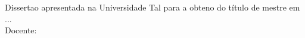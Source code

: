 \begin{titlepage}
  \begin{center}
    \Large{\AUTOR}\\[10cm]
    \Large{\textbf{\TITULO}}\\[2cm]
    \hspace{.45\textwidth} %
    \begin{minipage}{.5\textwidth}
      \begin{normalsize}
        Disserta\ca o apresentada na Universidade Tal para a obten\ca o do t\'itulo de mestre em ...\\[1.5cm]
        Docente: \ORIENTADOR
      \end{normalsize}
    \end{minipage}
    \vfill

    \begin{normalsize}
      \LOCAL\\
      \DATA
    \end{normalsize}
  \end{center}
\end{titlepage}
